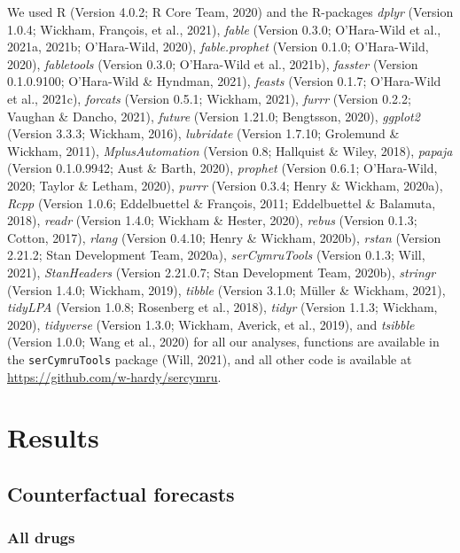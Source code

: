 \documentclass[
  english,
  man,floatsintext]{apa7}
\begin{document}
We used R (Version 4.0.2; R Core Team, 2020) and the R-packages \emph{dplyr} (Version 1.0.4; Wickham, François, et al., 2021), \emph{fable} (Version 0.3.0; O'Hara-Wild et al., 2021a, 2021b; O'Hara-Wild, 2020), \emph{fable.prophet} (Version 0.1.0; O'Hara-Wild, 2020), \emph{fabletools} (Version 0.3.0; O'Hara-Wild et al., 2021b), \emph{fasster} (Version 0.1.0.9100; O'Hara-Wild \& Hyndman, 2021), \emph{feasts} (Version 0.1.7; O'Hara-Wild et al., 2021c), \emph{forcats} (Version 0.5.1; Wickham, 2021), \emph{furrr} (Version 0.2.2; Vaughan \& Dancho, 2021), \emph{future} (Version 1.21.0; Bengtsson, 2020), \emph{ggplot2} (Version 3.3.3; Wickham, 2016), \emph{lubridate} (Version 1.7.10; Grolemund \& Wickham, 2011), \emph{MplusAutomation} (Version 0.8; Hallquist \& Wiley, 2018), \emph{papaja} (Version 0.1.0.9942; Aust \& Barth, 2020), \emph{prophet} (Version 0.6.1; O'Hara-Wild, 2020; Taylor \& Letham, 2020), \emph{purrr} (Version 0.3.4; Henry \& Wickham, 2020a), \emph{Rcpp} (Version 1.0.6; Eddelbuettel \& François, 2011; Eddelbuettel \& Balamuta, 2018), \emph{readr} (Version 1.4.0; Wickham \& Hester, 2020), \emph{rebus} (Version 0.1.3; Cotton, 2017), \emph{rlang} (Version 0.4.10; Henry \& Wickham, 2020b), \emph{rstan} (Version 2.21.2; Stan Development Team, 2020a), \emph{serCymruTools} (Version 0.1.3; Will, 2021), \emph{StanHeaders} (Version 2.21.0.7; Stan Development Team, 2020b), \emph{stringr} (Version 1.4.0; Wickham, 2019), \emph{tibble} (Version 3.1.0; Müller \& Wickham, 2021), \emph{tidyLPA} (Version 1.0.8; Rosenberg et al., 2018), \emph{tidyr} (Version 1.1.3; Wickham, 2020), \emph{tidyverse} (Version 1.3.0; Wickham, Averick, et al., 2019), and \emph{tsibble} (Version 1.0.0; Wang et al., 2020) for all our analyses, functions are available in the \texttt{serCymruTools} package (Will, 2021), and all other code is available at \url{https://github.com/w-hardy/sercymru}.

\hypertarget{results}{%
\section{Results}\label{results}}

\hypertarget{counterfactual-forecasts}{%
\subsection{Counterfactual forecasts}\label{counterfactual-forecasts}}

\hypertarget{all-drugs}{%
\subsubsection{All drugs}\label{all-drugs}}
\end{document}
